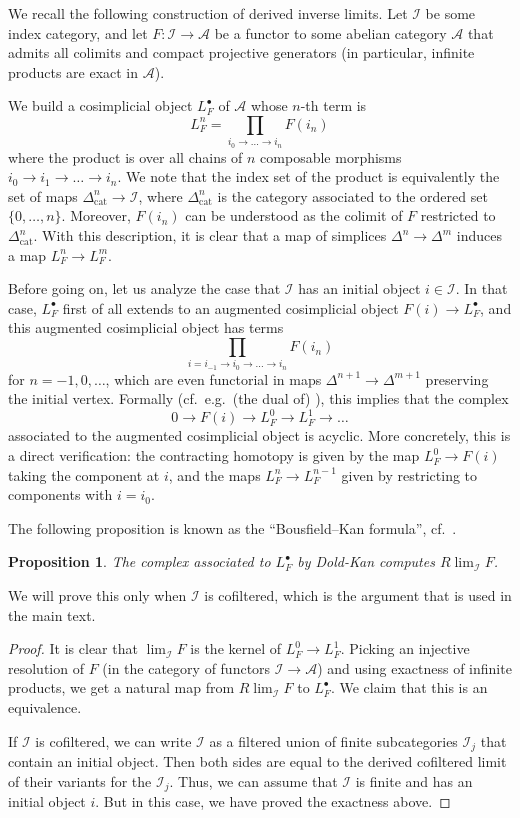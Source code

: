 \documentclass[11pt]{amsbook}
\numberwithin{equation}{section}
\numberwithin{theorem}{section}
\newtheorem{proposition}[theorem]{Proposition}
\theoremstyle{definition}
\begin{document}
We recall the following construction of derived inverse limits. Let $\mathcal I$ be some index category, and let $F: \mathcal I\to \mathcal{A}$ be a functor to some abelian category $\mathcal A$ that admits all colimits and compact projective generators (in particular, infinite products are exact in $\mathcal A$).

We build a cosimplicial object $L_F^\bullet$ of $\mathcal A$ whose $n$-th term is
\[
L_F^n = \prod_{i_0\to\ldots\to i_n} F(i_n)
\]
where the product is over all chains of $n$ composable morphisms $i_0\to i_1\to\ldots \to i_n$. We note that the index set of the product is equivalently the set of maps $\Delta^n_{\mathrm{cat}}\to \mathcal I$, where $\Delta^n_{\mathrm{cat}}$ is the category associated to the ordered set $\{0,\ldots,n\}$. Moreover, $F(i_n)$ can be understood as the colimit of $F$ restricted to $\Delta^n_{\mathrm{cat}}$. With this description, it is clear that a map of simplices $\Delta^n\to \Delta^m$ induces a map $L_F^n\to L_F^m$.

Before going on, let us analyze the case that $\mathcal I$ has an initial object $i\in \mathcal I$. In that case, $L_F^\bullet$ first of all extends to an augmented cosimplicial object $F(i)\to L_F^\bullet$, and this augmented cosimplicial object has terms
\[
\prod_{i=i_{-1}\to i_0\to \ldots\to i_n} F(i_n)
\]
for $n=-1,0,\ldots$, which are even functorial in maps $\Delta^{n+1}\to \Delta^{m+1}$ preserving the initial vertex. Formally (cf.~e.g.~(the dual of) \cite[Lemma 6.1.3.16]{LurieHTT}), this implies that the complex
\[
0\to F(i)\to L_F^0\to L_F^1\to \ldots
\]
associated to the augmented cosimplicial object is acyclic. More concretely, this is a direct verification: the contracting homotopy is given by the map $L_F^0\to F(i)$ taking the component at $i$, and the maps $L_F^n\to L_F^{n-1}$ given by restricting to components with $i=i_0$.

The following proposition is known as the ``Bousfield--Kan formula'', cf.~\cite[Chapter XI]{BousfieldKan}.

\begin{proposition} The complex associated to $L_F^\bullet$ by Dold-Kan computes $R\lim_{\mathcal I} F$.
\end{proposition}

We will prove this only when $\mathcal I$ is cofiltered, which is the argument that is used in the main text.

\begin{proof} It is clear that $\lim_{\mathcal I} F$ is the kernel of $L_F^0\to L_F^1$. Picking an injective resolution of $F$ (in the category of functors $\mathcal I\to \mathcal A$) and using exactness of infinite products, we get a natural map from $R\lim_{\mathcal I} F$ to $L_F^\bullet$. We claim that this is an equivalence.

If $\mathcal I$ is cofiltered, we can write $\mathcal I$ as a filtered union of finite subcategories $\mathcal I_j$ that contain an initial object. Then both sides are equal to the derived cofiltered limit of their variants for the $\mathcal I_j$. Thus, we can assume that $\mathcal I$ is finite and has an initial object $i$. But in this case, we have proved the exactness above.
\end{proof}
\end{document}
